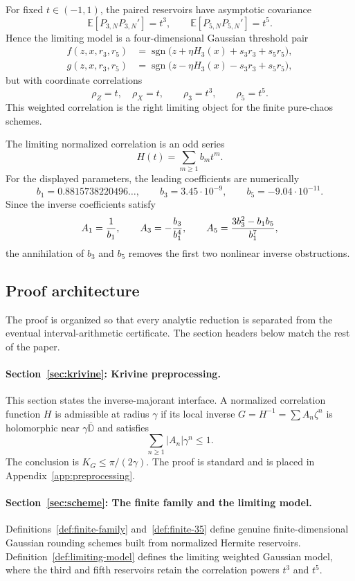 \documentclass[11pt]{article}
\newcommand{\D}{\mathbb D}
\newcommand{\E}{\mathbb E}
\newcommand{\1}{\mathbf 1}
\newcommand{\sgn}{\operatorname{sgn}}
\newcommand{\KG}{K_G}
\theoremstyle{plain}
\theoremstyle{definition}
\theoremstyle{remark}
\begin{document}
For fixed \(t\in(-1,1)\), the paired reservoirs have asymptotic covariance
\[
  \E[P_{3,N}P_{3,N}']=t^3,
  \qquad
  \E[P_{5,N}P_{5,N}']=t^5.
\]
Hence the limiting model is a four-dimensional Gaussian threshold pair
\begin{align*}
  f(z,x,r_3,r_5)&=\sgn\bigl(z+\eta H_3(x)+s_3r_3+s_5r_5\bigr),\\
  g(z,x,r_3,r_5)&=\sgn\bigl(z-\eta H_3(x)-s_3r_3+s_5r_5\bigr),
\end{align*}
but with coordinate correlations
\[
  \rho_Z=t,\quad \rho_X=t,
  \qquad \rho_3=t^3,
  \qquad \rho_5=t^5.
\]
This weighted correlation is the right limiting object for the finite pure-chaos schemes.

The limiting normalized correlation is an odd series
\[
  H(t)=\sum_{m\ge1}b_m t^m.
\]
For the displayed parameters, the leading coefficients are numerically
\[
  b_1=0.8815738220496\ldots,
  \qquad b_3=3.45\cdot 10^{-9},
  \qquad b_5=-9.04\cdot 10^{-11}.
\]
Since the inverse coefficients satisfy
\[
  A_1={1\over b_1},\qquad
  A_3=-{b_3\over b_1^4},\qquad
  A_5={3b_3^2-b_1b_5\over b_1^7},
\]
the annihilation of \(b_3\) and \(b_5\) removes the first two nonlinear inverse obstructions.



\subsection{Proof architecture}\label{subsec:architecture}

The proof is organized so that every analytic reduction is separated from the eventual interval-arithmetic certificate.  The section headers below match the rest of the paper.

\paragraph{Section~\ref{sec:krivine}: Krivine preprocessing.}
This section states the inverse-majorant interface.  A normalized correlation function $H$ is admissible at radius $\gamma$ if its local inverse $G=H^{-1}=\sum A_n\zeta^n$ is holomorphic near $\gamma\overline{\D}$ and satisfies
\[
  \sum_{n\ge1}|A_n|\gamma^n\le 1.
\]
The conclusion is $\KG\le \pi/(2\gamma)$.  The proof is standard and is placed in Appendix~\ref{app:preprocessing}.

\paragraph{Section~\ref{sec:scheme}: The finite family and the limiting model.}
Definitions~\ref{def:finite-family} and~\ref{def:finite-35} define genuine finite-dimensional Gaussian rounding schemes built from normalized Hermite reservoirs.  Definition~\ref{def:limiting-model} defines the limiting weighted Gaussian model, where the third and fifth reservoirs retain the correlation powers $t^3$ and $t^5$.
\end{document}
